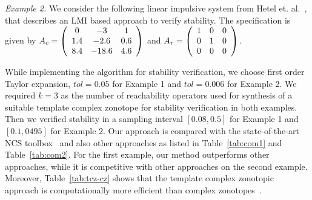 \emph{Example 2.} We consider the following linear impulsive system
from Hetel et. al.~\cite{2013hetel}, that describes an LMI based
approach to verify stability. The specification is given by
$A_c=\left(\begin{array}{ccc} 0 & -3 & 1\\ 1.4 & -2.6 & 0.6\\ 8.4 &
  -18.6 & 4.6
\end{array}\right)
$ and $A_r=\left(\begin{array}{ccc} 1 & 0 & 0\\ 0 & 1 & 0\\ 0 & 0 & 0
\end{array}\right).$

While implementing the algorithm for stability verification, we choose
first order Taylor expansion, $tol=0.05$ for Example 1 and $tol=0.006$
for Example 2.  We required $k=3$ as the number of reachability
operators used for synthesis of a suitable template complex zonotope
for stability verification in both examples.  Then we verified
stability in a sampling interval $[0.08, 0.5]$ for Example 1 and
$[0.1,0495]$ for Example 2.  Our approach is compared with the
state-of-the-art NCS toolbox~\cite{BauLoo_NECSYS12a} and also other
approaches as listed in Table~\ref{tab:com1} and Table~\ref{tab:com2}.
For the first example, our method outperforms other approaches, while
it is competitive with other approaches on the second example.
Moreover, Table~\ref{tab:tcz-cz} shows that the template complex
zonotopic approach is computationally more efficient than complex
zonotopes~\cite{arvind2016lis}.

